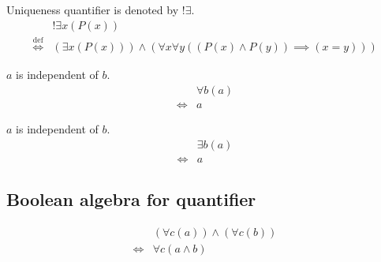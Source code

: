 \begin{defn}
\label{Definition:uniqueness_quantifier}
Uniqueness quantifier is denoted by $!\exists$.
\begin{align*}
& !\exists x (P(x)) \\
\overset{\operatorname{def}}{\iff} & (\exists x (P(x))) \land (\forall x \forall y ((P(x) \land P(y)) \implies (x = y)))
\end{align*}
\end{defn}

\begin{axm}
\label{Axiom:forall_independent_variable}
$a$ is independent of $b$.
\begin{align*}
& \forall b (a) \\
\iff & a
\end{align*}
\end{axm}

\begin{axm}
\label{Axiom:exists_independent_variable}
$a$ is independent of $b$.
\begin{align*}
& \exists b (a) \\
\iff & a
\end{align*}
\end{axm}

\subsection{Boolean algebra for quantifier}
\begin{prop}
\label{Proposition:forall_land_commutativity}
\begin{align*}
& (\forall c (a)) \land (\forall c (b)) \\
\iff & \forall c (a \land b)
\end{align*}
\end{prop}

